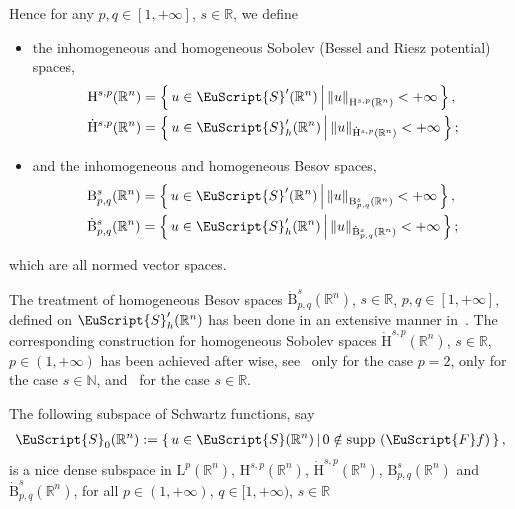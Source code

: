 \documentclass[AHL,Unicode,longabstracts,published]{cedram}
\DeclareMathOperator{\supp}{supp\,}
\newcommand{\bbR}{\mathbb{R}}
\newcommand{\bbN}{\mathbb{N}}
\newcommand{\rmH}{\mathrm{H}}%
\newcommand{\rmB}{\mathrm{B}}
\newcommand{\rmL}{\mathrm{L}}
\newcommand{\eus}{\EuScript}
\begin{document}
Hence for any $p,q\in[1,+\infty]$, $s\in\bbR$, we define
\begin{itemize}
\item the inhomogeneous and homogeneous Sobolev (Bessel and Riesz potential) spaces,
\begin{align*}
\rmH^{s,p}(\bbR^n) &=\left\{\, u\in\eus{S}'(\bbR^n) \,\middle|\, \left\| {u} \right\|_{\rmH^{s,p}(\bbR^n)}<+\infty \,\right\},\\
\dot{\rmH}^{s,p}(\bbR^n) &=\left\{\, u\in\eus{S}'_h(\bbR^n) \,\middle|\, \left\| {u} \right\|_{\dot{\rmH}^{s,p}(\bbR^n)}<+\infty \,\right\};
\end{align*}
\item and the inhomogeneous and homogeneous Besov spaces,
\begin{align*}
\rmB^{s}_{p,q}(\bbR^n) &=\left\{\, u\in\eus{S}'(\bbR^n) \,\middle|\, \left\| {u} \right\|_{\rmB^{s}_{p,q}(\bbR^n)}<+\infty \,\right\},\\
\dot{\rmB}^{s}_{p,q}(\bbR^n) &=\left\{\, u\in\eus{S}'_h(\bbR^n) \,\middle|\, \left\| {u} \right\|_{\dot{\rmB}^{s}_{p,q}(\bbR^n)}<+\infty \,\right\}; 
\end{align*}
\end{itemize}
which are all normed vector spaces.

The treatment of homogeneous Besov spaces $\dot{\rmB}^{s}_{p,q}(\bbR^n)$, $s\in\bbR$, $p,q\in[1,+\infty]$, defined on $\eus{S}'_h(\bbR^n)$ has been done in an extensive manner in~\cite[Chapter~2]{bookBahouriCheminDanchin}. The corresponding construction for homogeneous Sobolev spaces $\dot{\rmH}^{s,p}(\bbR^n)$, $s\in\bbR$, $p\in(1,+\infty)$ has been achieved after wise, see~\cite[Chapter~1]{bookBahouriCheminDanchin} only for the case $p=2$, \cite[Chapter~3]{DanchinHieberMuchaTolk2020} only for the case $s\in\bbN $, and~\cite[Section~2]{Gaudin2022} for the case $s\in\bbR$.

The following subspace of Schwartz functions, say
\begin{align*}
\eus{S}_0(\bbR^n):=\left\{\, u\in \eus{S}(\bbR^n)\,\middle|\, 0\notin \supp\left(\eus{F}f\right) \,\right\},
\end{align*}
is a nice dense subspace in $\rmL^p(\bbR^n)$, $\rmH^{s,p}(\bbR^n)$, $\dot{\rmH}^{s,p}(\bbR^n)$, $\rmB^{s}_{p,q}(\bbR^n)$ and $\dot{\rmB}^{s}_{p,q}(\bbR^n)$, for all $p\in(1,+\infty)$, $q\in[1,+\infty)$, $s\in\bbR$
\end{document}
